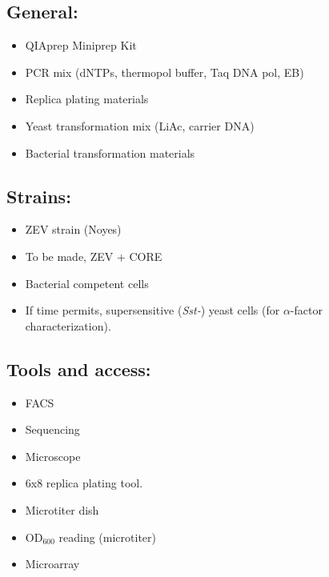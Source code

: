 \documentclass[landscape,a4paper]{article}
\begin{document}
\hfill
\begin{minipage}[t]{0.3\textwidth}
\subsection*{General:}
\begin{itemize}
    \item QIAprep Miniprep Kit
    \item PCR mix (dNTPs, thermopol buffer, Taq DNA pol, EB)
    \item Replica plating materials
    \item Yeast transformation mix (LiAc, carrier DNA)
    \item Bacterial transformation materials
\end{itemize}

\subsection*{Strains:}
\begin{itemize}
    \item ZEV strain (Noyes)
    \item To be made, ZEV + CORE
    \item Bacterial competent cells
    \item If time permits, supersensitive (\emph{Sst-}) yeast cells (for $\alpha$-factor characterization).
\end{itemize}

\subsection*{Tools and access:}
\begin{itemize}
    \item FACS
    \item Sequencing
    \item Microscope
    \item 6x8 replica plating tool.
    \item Microtiter dish 
    \item OD$_{600}$ reading (microtiter)
    \item Microarray
\end{itemize}
\end{minipage}
\hfill
\end{document}
